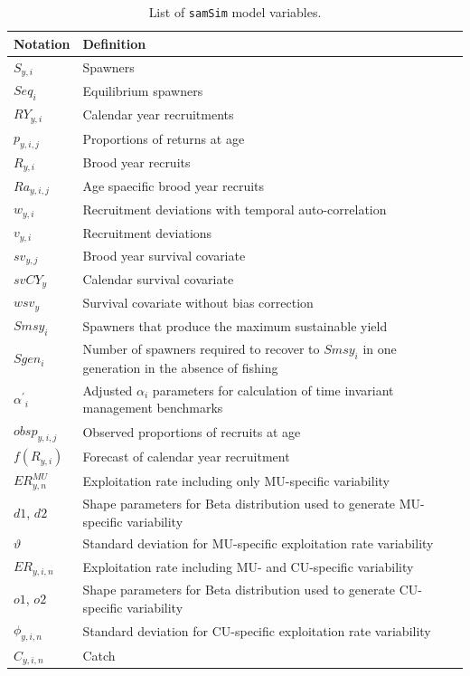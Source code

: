 \documentclass[11pt]{book}
\begin{document}
\begin{longtable}[]{l p{13.5cm}}
\caption{List of \texttt{samSim} model variables.}\\
\hline
Notation & Definition \\ 
\hline
\endhead
\hline
$S_{y,i}$ & Spawners\\
$Seq_{i}$ & Equilibrium spawners\\
$RY_{y,i}$ & Calendar year recruitments\\
$p_{y,i,j}$ & Proportions of returns at age\\
$R_{y,i}$ & Brood year recruits \\
$Ra_{y,i,j}$ & Age spaecific brood year recruits\\
$w_{y,i}$ & Recruitment deviations with temporal auto-correlation\\
$v_{y,i}$ & Recruitment deviations\\
$sv_{y,j}$ & Brood year survival covariate\\
$svCY_{y}$ & Calendar survival covariate\\
$wsv_{y}$ & Survival covariate without bias correction\\
$Smsy_{i}$ & Spawners that produce the maximum sustainable yield \\
$Sgen_{i}$ & Number of spawners required to recover to $Smsy_{i}$ in one generation in the absence of fishing \\
${\alpha^\prime}_{i}$ & Adjusted $\alpha_{i}$ parameters for calculation of time invariant management benchmarks\\
$obsp_{y,i,j}$ & Observed proportions of recruits at age\\
$f(R_{y,i})$ &  Forecast of calendar year recruitment\\
$ER^{MU}_{y,n}$ & Exploitation rate including only MU-specific variability\\
$d1$, $d2$ & Shape parameters for Beta distribution used to generate MU-specific variability\\
$\vartheta$ & Standard deviation for MU-specific exploitation rate variability\\
$ER_{y,i,n}$ & Exploitation rate including MU- and CU-specific variability\\
$o1$, $o2$ & Shape parameters for Beta distribution used to generate CU-specific variability\\
$\phi_{y,i,n}$ & Standard deviation for CU-specific exploitation rate variability\\
${C}_{y,i,n}$ & Catch \\

\end{longtable}
\end{document}
